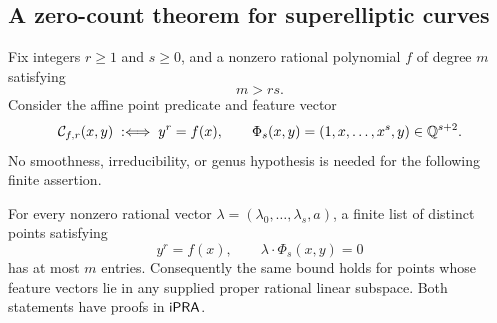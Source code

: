 \subsection{A zero-count theorem for superelliptic curves}

Fix integers $r\ge1$ and $s\ge0$, and a nonzero rational polynomial
$f$ of degree $m$ satisfying
\[
                         m>rs.
\]
Consider the affine point predicate and feature vector
\[
 \mathcal C_{f,r}(x,y)\;:\Longleftrightarrow\;y^r=f(x),
 \qquad
 \Phi_s(x,y)=(1,x,\ldots,x^s,y)\in\mathbb Q^{s+2}.
\]
No smoothness, irreducibility, or genus hypothesis is needed for the
following finite assertion.

\begin{theorem}
\label{thm:superelliptic-section}
For every nonzero rational vector
$\lambda=(\lambda_0,\ldots,\lambda_s,a)$, a finite list of distinct
points satisfying
\[
             y^r=f(x),\qquad \lambda\cdot\Phi_s(x,y)=0
\]
has at most $m$ entries. Consequently the same bound holds for points
whose feature vectors lie in any supplied proper rational linear
subspace. Both statements have proofs in $\mathsf{iPRA}$.
\end{theorem}
